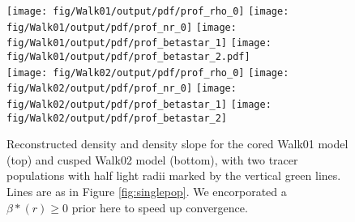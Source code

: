 \begin{figure*}
    \begin{center}
        \texttt{[image: fig/Walk01/output/pdf/prof\_rho\_0]}\hspace{-3mm}
        \texttt{[image: fig/Walk01/output/pdf/prof\_nr\_0]}\hspace{-3mm}
        \texttt{[image: fig/Walk01/output/pdf/prof\_betastar\_1]}\hspace{-3mm}
        \texttt{[image: fig/Walk01/output/pdf/prof\_betastar\_2.pdf]}\\

        \texttt{[image: fig/Walk02/output/pdf/prof\_rho\_0]}\hspace{-3mm}
        \texttt{[image: fig/Walk02/output/pdf/prof\_nr\_0]}\hspace{-3mm}
        \texttt{[image: fig/Walk02/output/pdf/prof\_betastar\_1]}\hspace{-3mm}
        \texttt{[image: fig/Walk02/output/pdf/prof\_betastar\_2]}\\

        \caption{Reconstructed density and density
          slope for the cored Walk01 model (top)
          and cusped Walk02 model (bottom), with
          two tracer populations with half light
          radii marked by the vertical green
          lines. Lines are as in Figure
          \ref{fig:singlepop}. We encorporated a $\beta*(r)\geq0$
          prior here to speed up convergence.}
        \label{fig:cusp2pop}
    \end{center}
\end{figure*}

